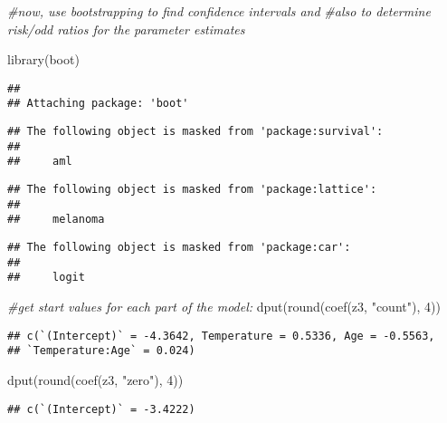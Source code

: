 \documentclass[
]{article}
\newenvironment{Shaded}{\begin{snugshade}}{\end{snugshade}}
\newcommand{\CommentTok}[1]{\textcolor[rgb]{0.56,0.35,0.01}{\textit{#1}}}
\newcommand{\DecValTok}[1]{\textcolor[rgb]{0.00,0.00,0.81}{#1}}
\newcommand{\FunctionTok}[1]{\textcolor[rgb]{0.00,0.00,0.00}{#1}}
\newcommand{\NormalTok}[1]{#1}
\newcommand{\StringTok}[1]{\textcolor[rgb]{0.31,0.60,0.02}{#1}}
\begin{document}
\begin{Shaded}
\begin{Highlighting}[]
\CommentTok{\#now, use bootstrapping to find confidence intervals and }
\CommentTok{\#also to determine risk/odd ratios for the parameter estimates}

\FunctionTok{library}\NormalTok{(boot)}
\end{Highlighting}
\end{Shaded}

\begin{verbatim}
## 
## Attaching package: 'boot'
\end{verbatim}

\begin{verbatim}
## The following object is masked from 'package:survival':
## 
##     aml
\end{verbatim}

\begin{verbatim}
## The following object is masked from 'package:lattice':
## 
##     melanoma
\end{verbatim}

\begin{verbatim}
## The following object is masked from 'package:car':
## 
##     logit
\end{verbatim}

\begin{Shaded}
\begin{Highlighting}[]
\CommentTok{\#get start values for each part of the model:}
\FunctionTok{dput}\NormalTok{(}\FunctionTok{round}\NormalTok{(}\FunctionTok{coef}\NormalTok{(z3, }\StringTok{"count"}\NormalTok{), }\DecValTok{4}\NormalTok{))}
\end{Highlighting}
\end{Shaded}

\begin{verbatim}
## c(`(Intercept)` = -4.3642, Temperature = 0.5336, Age = -0.5563, 
## `Temperature:Age` = 0.024)
\end{verbatim}

\begin{Shaded}
\begin{Highlighting}[]
\FunctionTok{dput}\NormalTok{(}\FunctionTok{round}\NormalTok{(}\FunctionTok{coef}\NormalTok{(z3, }\StringTok{"zero"}\NormalTok{), }\DecValTok{4}\NormalTok{))}
\end{Highlighting}
\end{Shaded}

\begin{verbatim}
## c(`(Intercept)` = -3.4222)
\end{verbatim}
\end{document}
